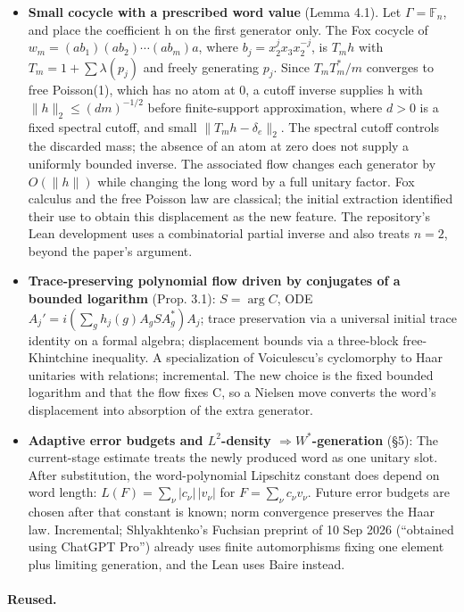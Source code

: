 \documentclass[11pt]{article}
\newcommand{\F}{\mathbb{F}}
\begin{document}
\begin{itemize}
\item \textbf{Small cocycle with a prescribed word value} (Lemma 4.1). Let $\Gamma=\F_n$, and place the coefficient h on the first generator only. The Fox cocycle of $w_m=(ab_1)(ab_2)\cdots(ab_m)a$, where $b_j=x_2^jx_3x_2^{-j}$, is $T_mh$ with $T_m=1+\sum\lambda(p_j)$ and freely generating $p_j$. Since $T_mT_m^*/m$ converges to free Poisson(1), which has no atom at 0, a cutoff inverse supplies h with $\|h\|_2\le(dm)^{-1/2}$ before finite-support approximation, where $d>0$ is a fixed spectral cutoff, and small $\|T_mh-\delta_e\|_2$. The spectral cutoff controls the discarded mass; the absence of an atom at zero does not supply a uniformly bounded inverse. The associated flow changes each generator by $O(\|h\|)$ while changing the long word by a full unitary factor. Fox calculus and the free Poisson law are classical; the initial extraction identified their use to obtain this displacement as the new feature. The repository\textquoteright{}s Lean development uses a combinatorial partial inverse and also treats $n=2$, beyond the paper\textquoteright{}s argument.
\item \textbf{Trace-preserving polynomial flow driven by conjugates of a bounded logarithm} (Prop. 3.1): $S=\arg C$, ODE $A_j'=i(\sum_gh_j(g)A_gSA_g^*)A_j$; trace preservation via a universal initial trace identity on a formal algebra; displacement bounds via a three-block free-Khintchine inequality. A specialization of Voiculescu's cyclomorphy to Haar unitaries with relations; incremental. The new choice is the fixed bounded logarithm and that the flow fixes C, so a Nielsen move converts the word's displacement into absorption of the extra generator.
\item \textbf{Adaptive error budgets and $L^2$-density $\Rightarrow W^*$-generation} (\S{}5): The current-stage estimate treats the newly produced word as one unitary slot. After substitution, the word-polynomial Lipschitz constant does depend on word length: $L(F)=\sum_\nu|c_\nu|\,|v_\nu|$ for $F=\sum_\nu c_\nu v_\nu$. Future error budgets are chosen after that constant is known; norm convergence preserves the Haar law. Incremental; Shlyakhtenko's Fuchsian preprint of 10 Sep 2026 (``obtained using ChatGPT Pro'') already uses finite automorphisms fixing one element plus limiting generation, and the Lean uses Baire instead.
\end{itemize}

\paragraph{Reused.}
\end{document}
